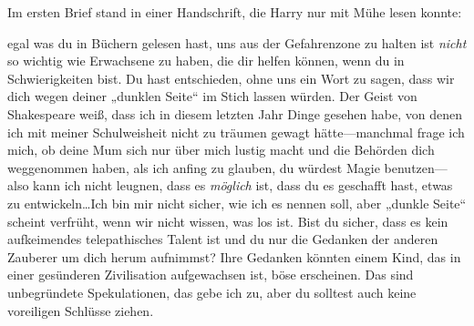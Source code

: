Im ersten Brief stand in einer Handschrift, die Harry nur mit Mühe lesen konnte:

\begin{writtenNote}

egal was du in Büchern gelesen hast, uns aus der Gefahrenzone zu halten ist \emph{nicht} so wichtig wie Erwachsene zu haben, die dir helfen können, wenn du in Schwierigkeiten bist. Du hast entschieden, ohne uns ein Wort zu sagen, dass wir dich wegen deiner „dunklen Seite“ im Stich lassen würden. Der Geist von Shakespeare weiß, dass ich in diesem letzten Jahr Dinge gesehen habe, von denen ich mit meiner Schulweisheit nicht zu träumen gewagt hätte—manchmal frage ich mich, ob deine Mum sich nur über mich lustig macht und die Behörden dich weggenommen haben, als ich anfing zu glauben, du würdest Magie benutzen—also kann ich nicht leugnen, dass es \emph{möglich} ist, dass du es geschafft hast, etwas zu entwickeln…Ich bin mir nicht sicher, wie ich es nennen soll, aber „dunkle Seite“ scheint verfrüht, wenn wir nicht wissen, was los ist. Bist du sicher, dass es kein aufkeimendes telepathisches Talent ist und du nur die Gedanken der anderen Zauberer um dich herum aufnimmst? Ihre Gedanken könnten einem Kind, das in einer gesünderen Zivilisation aufgewachsen ist, böse erscheinen. Das sind unbegründete Spekulationen, das gebe ich zu, aber du solltest auch keine voreiligen Schlüsse ziehen.


\end{writtenNote}
